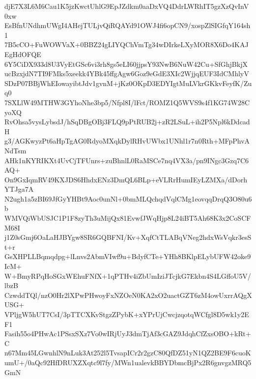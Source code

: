 djE7X3L6M6Cau1K5jzKwctUhlG9EpJZdkm0aaDxVQ4DdrLWRhIT5gzXzQvInV0xw
EsBfnUNdhmUWgI4AHejTULjvQiRQAYd91OWJ4fi6opCN9/xospZlSIGfqY164sh1
7B5cCO+FuWOWVaX+0BBZ24gLIYQChVmTg34wDIrkeLXyMOR8X6Do4KAJEgHdOFQE
6Y5CiDX933d8U3VyEtGSc6vi3rh8gs5eLI60jjpsY93NwB6NuW42Cu+SfGhjBkjX
ucBzxjdN7TI9FMks5xeekk4YBk45ffgAgw6Goz9eGdE3XIc2WjjqEUF3IdCMhlyV
SDzP07BBjWhEIowayibtJdv1gvnM+jKz0OKpD3EDYIgtMuLVkrGKkvFeyfK/Zuq0
7SXLlW49MTHW3GYhoNhe3bp5/Nfpl8I/lFct/ROMZ1Q5WVS9s4f1KG74W28CyoXQ
RvOhsa5vysLybsdJ/hSqDBgOBj3FLQ9pPtRUB2j+zR2LSuL+ih2P5Npl6kDdcadH
g3/AGKwyzPt6aHpTgAG0RdyoMXqkDylRHvUWbx1UNhl1r7n0Rth+MFpPhvANdTsm
AHk1nKYRIKXt4UvCjTFUnrs+zuBhnlL0RaMSCe7nq4VX3a/pn9INgc3Gzq7C6AQ+
On9GxIqmRV49KXJDS6HhdxENz3DmQL6BLp+eVLRrHumIEyLZMXa/dDorhYTJga7A
N2ugh1a5zBI69JfGyYHBt9Aoc0unNl+0bmMLQchqdVqlCMg1eovqqDrqQ3O80u6b
WMVQiWbUSJC1P1F8zyTh3uMijQx81EvwfJWqHjp8L24iBT5Ah68K3x2CoSCFM68I
j1Z0sGmj6OaLaHJBYgw8SR6GQBFNI/Kv+XqfCtTLABqVNeg2hdxWsVqkr3esSt+r
GsXHPLLBqmqdpg+lLnvs2AbmVIwf9u+BdyfCTe+YHh8BKlpELybUFW42oke9IcM+
W+BmyRPqHoSGxWEhuFNfX+1qPTHv4iZbUmIziJTcjkG7Ekbn4S4LGffoU5V/lbzB
CzwddTQl/nzO0Hr2lXPwPHwoyFxNZOeN0KA2xO2uactGZT6zM4owUxrrAQgXUSG+
VPljgW5hUT7CsI/3pTTCXKvStgzZPybK+xYPrUjCwcjzqotqWCfgl8D5wk1y2EF1
Fasih55o4PHwAc1PSsxSXz7Vo0wIRjUyJ3dmTjAf3cGAZ9JdqhCfZxsOBO+kRt+C
n67Mm45LGwnhlN9nLuk3At252l5TvsapICr2r2gzC80QfDZ51yN1QZ2BE9F6cuoK
umU+/0aQc92HfDRUXZXqtc9l7fy/MWn1ualevkBBYDbmcBjPx2R6gnvgzMRQ5GmN
